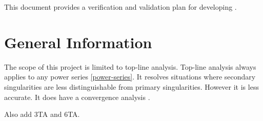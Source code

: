 \documentclass[12pt, titlepage]{article}
\begin{document}
This document provides a verification and validation plan for developing .

\section{General Information}

The scope of this  project is limited to top-line analysis.
Top-line analysis always applies to any power series \eqref{power-series}. It resolves situations
where secondary singularities are less distinguishable from primary singularities. However it is
less accurate. It does have a convergence analysis \citep{chang1982}.

Also add 3TA and 6TA.

%
%
%  
%  
%  
\end{document}
